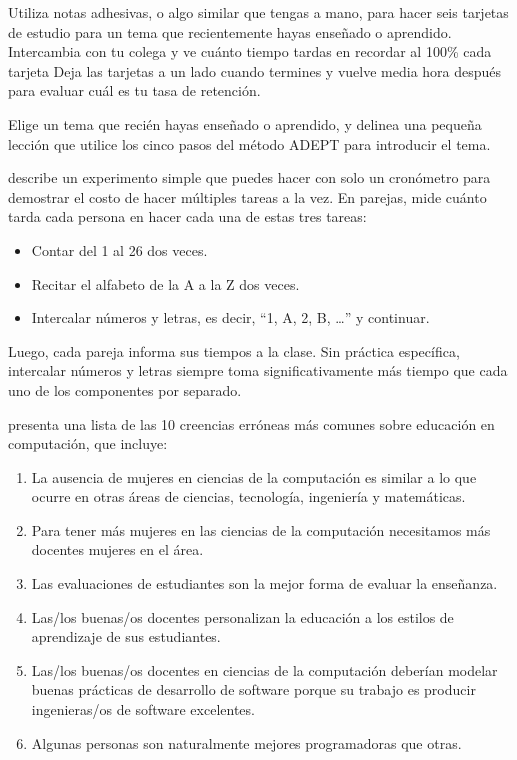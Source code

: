 
Utiliza notas adhesivas, o algo similar que tengas a mano,
para hacer seis tarjetas de estudio
para un tema que recientemente hayas enseñado o aprendido.
Intercambia con tu colega y ve cuánto tiempo tardas en recordar
al 100\% cada tarjeta
Deja las tarjetas a un lado cuando termines
y vuelve media hora después para evaluar cuál es tu tasa de retención.


Elige un tema que recién hayas enseñado o aprendido,
y delinea una pequeña lección que utilice los cinco pasos del método ADEPT para introducir el tema.


describe un experimento simple que puedes hacer con solo un cronómetro
para demostrar el costo de hacer múltiples tareas a la vez.
En parejas,
mide cuánto tarda cada persona en hacer cada una de estas tres tareas:

\begin{itemize}
\item
  Contar del 1 al 26 dos veces.
\item
  Recitar el alfabeto de la A a la Z dos veces.
\item
  Intercalar números y letras,
  es decir, ``1, A, 2, B, {\ldots}''
  y continuar.
\end{itemize}

Luego, cada pareja informa sus tiempos a la clase.
Sin práctica específica,
intercalar números y letras siempre toma significativamente más tiempo que cada uno de los componentes por separado.


\cite{Guzd2015b} presenta una lista de las 10 creencias erróneas más comunes sobre educación en computación,
que incluye:

\begin{enumerate}
\item
  La ausencia de mujeres en ciencias de la computación es similar a lo que ocurre en otras áreas de ciencias, tecnología, ingeniería y matemáticas.
\item
  Para tener más mujeres en las ciencias de la computación necesitamos más docentes mujeres en el área.
\item
  Las evaluaciones de estudiantes son la mejor forma de evaluar la enseñanza.
\item
  Las/los buenas/os docentes personalizan la educación a los estilos de aprendizaje de sus estudiantes.
\item
  Las/los buenas/os docentes en ciencias de la computación deberían modelar buenas prácticas de desarrollo de software porque su trabajo es producir ingenieras/os de software excelentes.
\item
  Algunas personas son naturalmente mejores programadoras que otras.
\end{enumerate}

